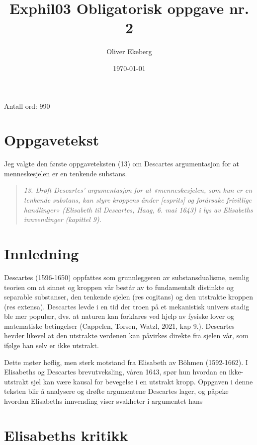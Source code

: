 \documentclass[12pt, a4paper]{article}
\title{Exphil03 Obligatorisk oppgave nr. 2}
\author{Oliver Ekeberg}
\date{\today}
\begin{document}
\maketitle

Antall ord: 990

\section{Oppgavetekst}

Jeg valgte den første oppgaveteksten (13) om Descartes argumentasjon for at menneskesjelen er en tenkende substans.

\begin{quote}
    \textit{13. Drøft Descartes’ argumentasjon for at «menneskesjelen, som kun er en tenkende substans, kan styre kroppens ånder [esprits] og forårsake frivillige handlinger» (Elisabeth til Descartes, Haag, 6. mai 1643) i lys av Elisabeths innvendinger (kapittel 9).}
\end{quote}



\section{Innledning}

Descartes (1596-1650) oppfattes som grunnleggeren av substansdualisme, nemlig teorien om at sinnet og kroppen vår består av to fundamentalt distinkte og separable substanser, den tenkende sjelen (res cogitans) og den utstrakte kroppen (res extensa). Descartes levde i en tid der troen på et mekanistisk univers stadig ble mer populær, dvs. at naturen kan forklares ved hjelp av fysiske lover og matematiske betingelser (Cappelen, Torsen, Watzl, 2021, kap 9.). Descartes hevder likevel at den utstrakte verdenen kan påvirkes direkte fra sjelen vår, som ifølge han selv er ikke utstrakt. 

\medskip
Dette møter høflig, men sterk motstand fra Elisabeth av B\"{o}hmen (1592-1662). I Elisabeths og Descartes brevutveksling, våren 1643, spør hun hvordan en ikke-utstrakt sjel kan være kausal for bevegelse i en utstrakt kropp. Oppgaven i denne teksten blir å analysere og drøfte argumentene Descartes lager, og påpeke hvordan Elisabeths innvending viser svakheter i argumentet hans


\section{Elisabeths kritikk}
\end{document}
